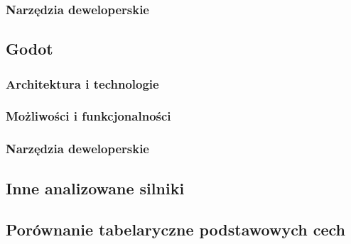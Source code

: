 \subsubsection{Narzędzia deweloperskie}

\subsection{Godot}
\subsubsection{Architektura i technologie}

\subsubsection{Możliwości i funkcjonalności}

\subsubsection{Narzędzia deweloperskie}

\subsection{Inne analizowane silniki}

\subsection{Porównanie tabelaryczne podstawowych cech}
